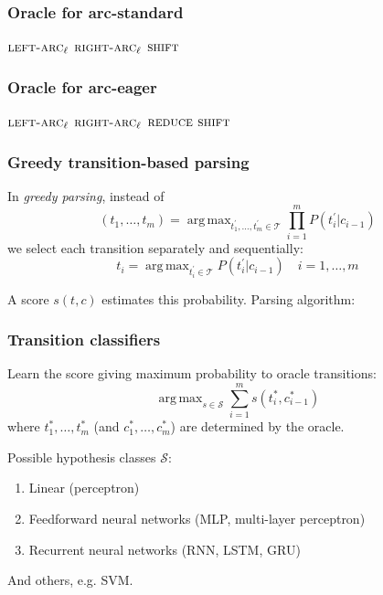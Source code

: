 \documentclass[t]{beamer}
\DeclareMathOperator*{\argmax}{arg\,max}
\begin{document}
\begin{frame}
    \frametitle{Oracle for arc-standard}
    \begin{algorithmic}[0]
            \RETURN $\textsc{left-arc}_\ell$
            \RETURN $\textsc{right-arc}_\ell$
        \ELSE
            \RETURN $\textsc{shift}$
        \ENDIF
    \ENDWHILE
    \end{algorithmic}
\end{frame}

\begin{frame}
    \frametitle{Oracle for arc-eager}
    \begin{algorithmic}[0]
            \RETURN $\textsc{left-arc}_\ell$
            \RETURN $\textsc{right-arc}_\ell$
            \RETURN $\textsc{reduce}$
        \ELSE
            \RETURN $\textsc{shift}$
        \ENDIF
    \ENDWHILE
    \end{algorithmic}
\end{frame}

\begin{frame}
    \frametitle{Greedy transition-based parsing}
    In \textit{greedy parsing}, instead of
    \[
    (t_1,\ldots,t_m)=\argmax_{t^\prime_1,\ldots,t^\prime_m \in \mathcal{T}} \prod_{i=1}^mP(t^\prime_i|c_{i-1})
    \]
    we select each transition separately and sequentially:
    \[
    t_i = \argmax_{t^\prime_i \in \mathcal{T}} P(t^\prime_i|c_{i-1}) \quad i=1,\ldots,m
    \]
    
    \pause
    
    A score $s(t, c)$ estimates this probability. Parsing algorithm:
    
    \begin{algorithmic}[0]
        \STATE{$c\leftarrow\Big(\argmax_{t\in\mathcal{T}}s(t,c)\Big)(c)$}
    \ENDWHILE
    \end{algorithmic}
\end{frame}

\begin{frame}
    \frametitle{Transition classifiers}
    Learn the score giving maximum probability to oracle transitions:
    \[
    \argmax_{s\in\mathcal{S}}\sum_{i=1}^ms(t^*_i,c^*_{i-1})
    \]
    where $t^*_1,\ldots,t^*_m$ (and $c^*_1,\ldots,c^*_m$) are determined by the oracle.
    
    \pause\vfill
    
    Possible hypothesis classes $\mathcal{S}$:
    \begin{enumerate}
    \item Linear (perceptron)
    \item Feedforward neural networks (MLP, multi-layer perceptron)
    \item Recurrent neural networks (RNN, LSTM, GRU)
    \end{enumerate}
    And others, e.g. SVM.
\end{frame}
\end{document}

